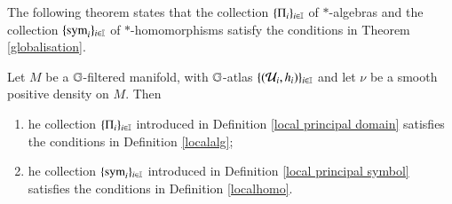 \documentclass[leqno]{amsart}
\begin{document}
	
	The following theorem states that the collection $\{\Pi_{i}\}_{i\in\mathbb I}$ of $*$-algebras and the collection $\{{\rm sym}_{i}\}_{i\in\mathbb I}$ of $*$-homomorphisms satisfy the conditions in Theorem \ref{globalisation}.
	\begin{theorem}\label{Pii-symi satisfy local}
		Let $M$ be a $\mathbb{G}$-filtered manifold, with $\mathbb{G}$-atlas $\{({\mathcal U}_{i},h_{i})\}_{i\in\mathbb I}$ and let $\nu$ be a smooth positive density on $M$. Then
		\begin{enumerate}[\rm(1)]
			\item\label{Pii satisfy local} he collection $\{\Pi_{i}\}_{i\in\mathbb I}$ introduced in Definition \ref{local principal domain} satisfies the conditions in Definition \ref{localalg};
			\item\label{symi satisfy local} he collection $\{{\rm sym}_{i}\}_{i\in\mathbb I}$ introduced in Definition \ref{local principal symbol} satisfies the conditions in Definition \ref{localhomo}.
		\end{enumerate}
	\end{theorem}
\end{document}
